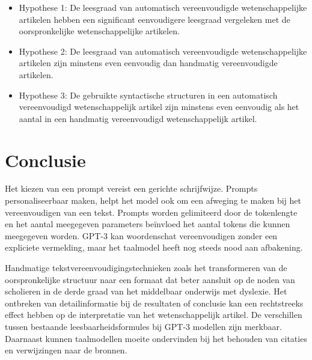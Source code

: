 \begin{itemize}
\item Hypothese 1: De leesgraad van automatisch vereenvoudigde wetenschappelijke artikelen hebben een significant eenvoudigere leesgraad vergeleken met de oorspronkelijke wetenschappelijke artikelen.
\item Hypothese 2: De leesgraad van automatisch vereenvoudigde wetenschappelijke artikelen zijn minstens even eenvoudig dan handmatig vereenvoudigde artikelen.
\item Hypothese 3: De gebruikte syntactische structuren in een automatisch vereenvoudigd wetenschappelijk artikel zijn minstens even eenvoudig als het aantal in een handmatig vereenvoudigd wetenschappelijk artikel.
\end{itemize} 

\section{Conclusie}

Het kiezen van een prompt vereist een gerichte schrijfwijze. Prompts personaliseerbaar maken, helpt het model ook om een afweging te maken bij het vereenvoudigen van een tekst. Prompts worden gelimiteerd door de tokenlengte en het aantal meegegeven parameters beïnvloed het aantal tokens die kunnen meegegeven worden. GPT-3 kan woordenschat vereenvoudigen zonder een expliciete vermelding, maar het taalmodel heeft nog steeds nood aan afbakening.

Handmatige tekstvereenvoudigingstechnieken zoals het transformeren van de oorspronkelijke structuur naar een formaat dat beter aansluit op de noden van scholieren in de derde graad van het middelbaar onderwijs met dyslexie. Het ontbreken van detailinformatie bij de resultaten of conclusie kan een rechtstreeks effect hebben op de interpretatie van het wetenschappelijk artikel. De verschillen tussen bestaande leesbaarheidsformules bij GPT-3 modellen zijn merkbaar. Daarnaast kunnen taalmodellen moeite ondervinden bij het behouden van citaties en verwijzingen naar de bronnen. 